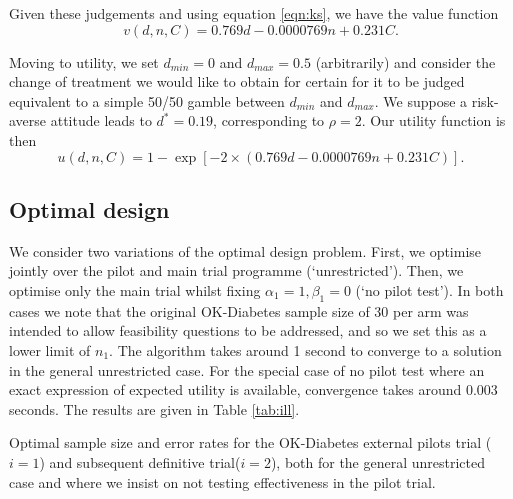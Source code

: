 \documentclass[sagev, Crown]{sagej} %
\begin{document}
Given these judgements and using equation \ref{eqn:ks}, we have the value function
$$ 
v(d, n, C) = 0.769 d - 0.0000769 n + 0.231 C.
$$

Moving to utility, we set $d_{min} = 0$ and $d_{max} = 0.5$ (arbitrarily) and consider the change of treatment we would like to obtain for certain for it to be judged equivalent to a simple 50/50 gamble between $d_{min}$ and $d_{max}$. We suppose a risk-averse attitude leads to $d^* = 0.19$, corresponding to $\rho = 2$. Our utility function is then
$$
u(d, n, C) = 1 - \exp[ - 2 \times (0.769 d - 0.0000769 n + 0.231 C)].
$$

\subsection{Optimal design}

We consider two variations of the optimal design problem. First, we optimise jointly over the pilot and main trial programme (`unrestricted'). Then, we optimise only the main trial whilst fixing $\alpha_1 = 1, \beta_1 = 0$ (`no pilot test'). In both cases we note that the original OK-Diabetes sample size of 30 per arm was intended to allow feasibility questions to be addressed, and so we set this as a lower limit of $n_1$. The algorithm takes around 1 second to converge to a solution in the general unrestricted case. For the special case of no pilot test where an exact expression of expected utility is available, convergence takes around 0.003 seconds. The results are given in Table \ref{tab:ill}. 

\begin{table}
\small\sf\centering
\caption{Optimal sample size and error rates for the OK-Diabetes external pilots trial ($i = 1$) and subsequent definitive trial($i = 2$), both for the general unrestricted case and where we insist on not testing effectiveness in the pilot trial.}

\label{tab:ill}
\end{table}
\end{document}

